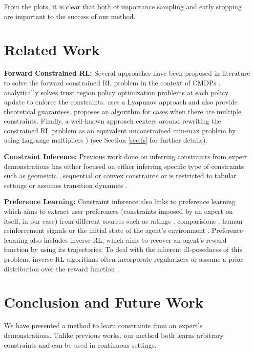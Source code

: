 \documentclass{article}
\begin{document}
From the plots, it is clear that both of importance sampling and early stopping are important to the success of our method.

\section{Related Work}
\textbf{Forward Constrained RL:} Several approaches have been proposed in literature to solve the forward constrained RL problem in the context of CMDPs \citep{altman1999cmdps}. \citet{achiam2017cpo} analytically solves trust region policy optimization problems at each policy update to enforce the constraints. \citet{chow2018lyapunov} uses a Lyapunov approach and also provide theoretical guarantees. \citet{le2019batch} proposes an algorithm for cases when there are multiple constraints. Finally, a well-known approach centers around rewriting the constrained RL problem as an equivalent unconstrained min-max problem by using Lagrange multipliers \citep{zhang2019recommender, tessler2018reward, bhatnagar2010ac-lagrangian}) (see Section \ref{sec:fs} for further details).

\textbf{Constraint Inference:} Previous work done on inferring constraints from expert demonstrations has either focused on either inferring specific type of constraints such as geometric \citep{arpino2017geometric, subramani2018inferring}, sequential \citep{pardowitz2005sequential} or convex \citep{miryoosefi2019convexconstraints} constraints or is restricted to tabular settings \citep{scobee2020maximum, chou2018learning} or assumes transition dynamics \citep{chou2020local}.

\textbf{Preference Learning:} Constraint inference also links to preference learning which aims to extract user preferences (constraints imposed by an expert on itself, in our case) from different sources such as ratings \citep{danielP2014active}, comparisions \citep{chris2017preferences, sadigh2017active}, human reinforcement signals \citep{mac2017interactive} or the initial state of the agent's environment \citep{shah2019implicit}. Preference learning also includes inverse RL, which aims to recover an agent's reward function by using its trajectories. To deal with the inherent ill-posedness of this problem, inverse RL algorithms often incorporate regularizers \citep{ho2016gail, finn2016gcl} or assume a prior distribution over the reward function \citep{wonseok2018bayesiangail, michini2012nonparametric, ramachandran2007bayesianirl}.

\section{Conclusion and Future Work}
We have presented a method to learn constraints from an expert's demonstrations. Unlike previous works, our method both learns arbitrary constraints and can be used in continuous settings.
\end{document}
